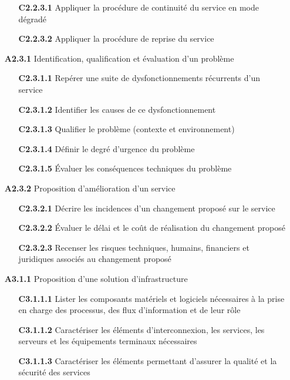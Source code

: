 \documentclass[12pt,a4paper,oneside,titlepage,final]{article}
\begin{document}
\begin{enumerate}
  \begin{itemize}
    \item [\textbf{C2.2.3.1}] Appliquer la procédure de
    continuité du service en mode dégradé
    \item [\textbf{C2.2.3.2}] Appliquer la procédure de reprise du
    service
  \end{itemize}
  \item [\textbf{A2.3.1}] Identification, qualification et évaluation
  d'un problème
  \begin{itemize}
    \item [\textbf{C2.3.1.1}] Repérer une suite de
    dysfonctionnements récurrents d'un service
    \item [\textbf{C2.3.1.2}] Identifier les causes de ce
    dysfonctionnement
    \item [\textbf{C2.3.1.3}] Qualifier le problème (contexte et
    environnement)
    \item [\textbf{C2.3.1.4}] Définir le degré d'urgence du problème
    \item [\textbf{C2.3.1.5}] Évaluer les conséquences techniques du
    problème
  \end{itemize}
  \item [\textbf{A2.3.2}] Proposition d'amélioration d'un service
  \begin{itemize}
    \item [\textbf{C2.3.2.1}] Décrire les incidences d'un
    changement proposé sur le service
    \item [\textbf{C2.3.2.2}] Évaluer le délai et le coût de
    réalisation du changement proposé
    \item [\textbf{C2.3.2.3}] Recenser les risques techniques,
    humains, financiers et juridiques associés au changement proposé
  \end{itemize}
  \item [\textbf{A3.1.1}] Proposition d'une solution d'infrastructure
  \begin{itemize}
    \item [\textbf{C3.1.1.1}] Lister les composants matériels et
    logiciels nécessaires à la prise en charge des processus, des flux
    d'information et de leur rôle
    \item [\textbf{C3.1.1.2}] Caractériser les éléments
    d'interconnexion, les services, les serveurs et les équipements
    terminaux nécessaires
    \item [\textbf{C3.1.1.3}] Caractériser les éléments permettant
    d'assurer la qualité et la sécurité des services

\end{itemize}
\end{enumerate}
\end{document}
